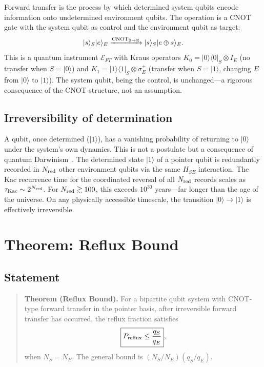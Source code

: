 \documentclass[aps,prl,twocolumn,superscriptaddress,hyperref]{revtex4-2}
\begin{document}
Forward transfer is the process by which determined system qubits encode information onto undetermined environment qubits. The operation is a CNOT gate with the system qubit as control and the environment qubit as target:
\begin{equation}
|s\rangle_S|e\rangle_E \xrightarrow{\rm CNOT_{S\to E}} |s\rangle_S |e \oplus s\rangle_E.
\label{eq:cnot}
\end{equation}
This is a quantum instrument $\mathcal{E}_{FT}$ with Kraus operators $K_0 = |0\rangle\langle 0|_S \otimes I_E$ (no transfer when $S=|0\rangle$) and $K_1 = |1\rangle\langle 1|_S \otimes \sigma^+_E$ (transfer when $S=|1\rangle$, changing $E$ from $|0\rangle$ to $|1\rangle$). The system qubit, being the control, is unchanged---a rigorous consequence of the CNOT structure, not an assumption.

\subsection{Irreversibility of determination}

A qubit, once determined ($|1\rangle$), has a vanishing probability of returning to $|0\rangle$ under the system's own dynamics. This is not a postulate but a consequence of quantum Darwinism~\cite{Zurek:2009}. The determined state $|1\rangle$ of a pointer qubit is redundantly recorded in $N_{\rm red}$ other environment qubits via the same $H_{SE}$ interaction. The Kac recurrence time for the coordinated reversal of all $N_{\rm red}$ records scales as $\tau_{\rm Kac} \sim 2^{N_{\rm red}}$. For $N_{\rm red} \gtrsim 100$, this exceeds $10^{30}$ years---far longer than the age of the universe. On any physically accessible timescale, the transition $|0\rangle \to |1\rangle$ is effectively irreversible.

\section{Theorem: Reflux Bound}

\subsection{Statement}

\begin{quote}
\textbf{Theorem (Reflux Bound).} For a bipartite qubit system with CNOT-type forward transfer in the pointer basis, after irreversible forward transfer has occurred, the reflux fraction satisfies
\begin{equation}
\boxed{P_{\rm reflux} \leq \frac{q_S}{q_E}},
\label{eq:s1}
\end{equation}
when $N_S = N_E$. The general bound is $(N_S/N_E)(q_S/q_E)$.
\end{quote}
\end{document}
